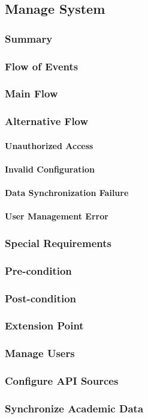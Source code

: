 \subsection{Manage System}
\subsubsection{Summary}

\subsubsection{Flow of Events}
\subsubsection*{Main Flow}

\subsubsection*{Alternative Flow}
\paragraph{Unauthorized Access}

\paragraph{Invalid Configuration}

\paragraph{Data Synchronization Failure}

\paragraph{User Management Error}

\subsubsection{Special Requirements}

\subsubsection{Pre-condition}

\subsubsection{Post-condition}

\subsubsection{Extension Point}
\subsubsection*{Manage Users}

\subsubsection*{Configure API Sources}

\subsubsection*{Synchronize Academic Data}
